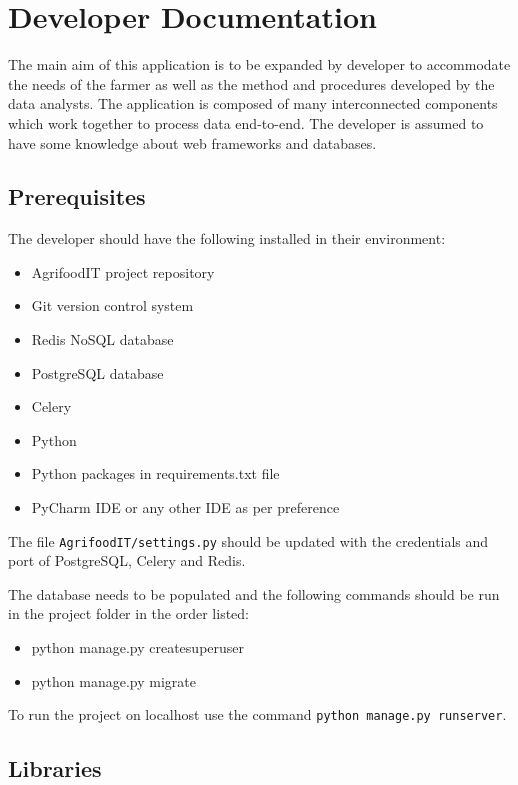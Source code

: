 \chapter{Developer Documentation}
\label{ch:developer}

The main aim of this application is to be expanded by developer to accommodate the needs of the farmer as 
well as the method and procedures developed by the data analysts.
The application is composed of many interconnected components which work together to process data end-to-end.
The developer is assumed to have some knowledge about web frameworks and databases.

\section{Prerequisites}
The developer should have the following installed in their environment:
\begin{itemize}
    \item AgrifoodIT project repository \cite{github_repo}
    \item Git version control system \cite{git}
    \item Redis NoSQL database \cite{redis}
    \item PostgreSQL database \cite{postgresql}
    \item Celery \cite{celery}
    \item Python
    \item Python packages in requirements.txt file
    \item PyCharm IDE or any other IDE as per preference
\end{itemize}

\begin{note}
	The file \texttt{AgrifoodIT/settings.py} should be updated with the credentials and port of PostgreSQL, Celery and Redis.
\end{note}

The database needs to be populated and the following commands should be run in the 
project folder in the order listed:
\begin{itemize}
    \item python manage.py createsuperuser
    \item python manage.py migrate
\end{itemize}

To run the project on localhost use the command \texttt{python manage.py runserver}.

\section{Libraries}
\label{sec:libaries}

